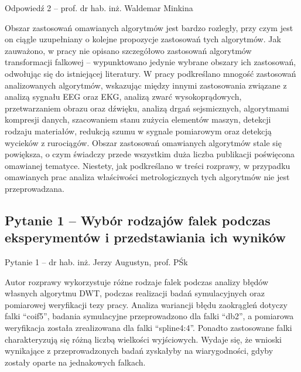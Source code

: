 \documentclass[12pt, polish, aspectratio = 169]{slides}
\begin{document}
\begin{frame}[allowframebreaks]{Odpowiedź 2 -- prof. dr hab. inż. Waldemar Minkina}\small
\begin{justify}
Obszar zastosowań omawianych algorytmów jest bardzo rozległy, przy czym jest on ciągle uzupełniany o kolejne propozycje zastosowań tych algorytmów. Jak zauważono, w pracy nie opisano szczegółowo zastosowań algorytmów transformacji falkowej -- wypunktowano jedynie wybrane obszary ich zastosowań, odwołując się do istniejącej literatury. W pracy podkreślano mnogość zastosowań analizowanych algorytmów, wskazując między innymi zastosowania związane z analizą sygnału EEG oraz EKG, analizą zwarć wysokoprądowych, przetwarzaniem obrazu oraz dźwięku, analizą drgań sejsmicznych, algorytmami kompresji danych, szacowaniem stanu zużycia elementów maszyn, detekcji rodzaju materiałów, redukcją szumu w sygnale pomiarowym oraz detekcją wycieków z rurociągów. Obszar zastosowań omawianych algorytmów stale się powiększa, o czym świadczy przede wszystkim duża liczba publikacji poświęcona omawianej tematyce. Niestety, jak podkreślano w treści rozprawy, w przypadku omawianych prac analiza właściwości metrologicznych tych algorytmów nie jest przeprowadzana.
\end{justify}
\end{frame}


\subsection{Pytanie 1 -- Wybór rodzajów falek podczas eksperymentów i przedstawiania ich wyników}

\begin{frame}{Pytanie 1 -- dr hab. inż. Jerzy Augustyn, prof. PŚk}\large
\begin{justify}
Autor rozprawy wykorzystuje różne rodzaje falek podczas analizy błędów własnych algorytmu DWT, podczas realizacji badań symulacyjnych oraz pomiarowej weryfikacji tezy pracy. Analiza wariancji błędu zaokrągleń dotyczy falki \enquote{coif5}, badania symulacyjne przeprowadzono dla falki \enquote{db2}, a pomiarowa weryfikacja została zrealizowana dla falki \enquote{spline4:4}. Ponadto zastosowane falki charakteryzują się różną liczbą wielkości wyjściowych. Wydaje się, że wnioski wynikające z przeprowadzonych badań zyskałyby na wiarygodności, gdyby zostały oparte na jednakowych falkach.
\end{justify}
\end{frame}
\end{document}
